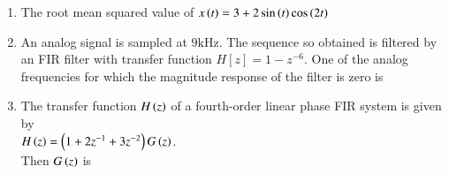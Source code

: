 \documentclass[journal,12pt,onecolumn]{IEEEtran}
\theoremstyle{remark}
\begin{document}
\begin{enumerate}
\item The root mean squared value of $x\left(t\right)=3+2\sin\left(t\right)\cos\left(2t\right)$ \par  \hfill{}
\begin{enumerate}
\end{enumerate} 

 

\item An analog signal is sampled at $9\text{kHz}$. The sequence so obtained is filtered by an FIR filter with transfer function $H[z]=1-z^{-6}$. One of the analog frequencies for which the magnitude response of the filter is zero is \par  \hfill{}
\begin{enumerate}
\end{enumerate} 

 

\item The transfer function $H\left(z\right)$ of a fourth-order linear phase FIR system is given by\\ $H\left(z\right)=\left(1+2z^{-1}+3z^{-2}\right)G\left(z\right)$.\\
Then $G\left(z\right)$ is\par  \hfill{}
\begin{enumerate}
\end{enumerate} 


\end{enumerate}
\end{document}
